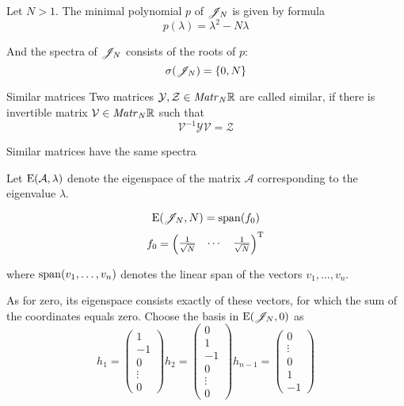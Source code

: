 \documentclass{article}
\begin{document}
\begin{propose}
    Let \( N>1 \).
    The minimal polynomial \( p \) of \( \mathscr{J}_{N} \) is given by formula
    \[p(\lambda) = \lambda^2 - N \lambda\]

    And the spectra of \( \mathscr{J}_{N} \) consists of the roots of \( p \):
    \[\sigma(\mathscr{J}_{N}) = \{ 0, N \}\]
\end{propose}

\begin{dfn}{Similar matrices}
    Two matrices \( \mathcal Y, \mathcal Z \in\mathit{Matr}_{N} {\mathbb{R}} \) are called similar,
    if there is invertible matrix \( \mathcal V\in\mathit{Matr}_{N} {\mathbb{R}} \) such that
    \[\mathcal V^{-1}\mathcal Y\mathcal V = \mathcal Z\]
\end{dfn}
\begin{propose}
    Similar matrices have the same spectra
\end{propose}

Let \( \mathrm{E}({\mathcal A}, {\lambda}) \) denote the eigenspace of the matrix \( \mathcal A \)
corresponding to the eigenvalue \( \lambda \).

\begin{propose}
    \[\mathrm{E}({\mathscr{J}_{N}}, {N}) = \mathrm{span}({f_0})\]
    \[f_0 = \begin{pmatrix} \frac{1}{\sqrt N} & \cdots & \frac{1}{\sqrt N} \end{pmatrix}^{\mathrm{T}}\]

        where \( \mathrm{span}({v_1, \ldots, v_n}) \) denotes the linear span of the vectors \( v_1, \ldots, v_n \).
\end{propose}

As for zero, its eigenspace consists exactly of these vectors,
for which the sum of the coordinates equals zero.
Choose the basis in \( \mathrm{E}({\mathscr{J}_{N}}, {0}) \) as
\[
h_1 = \begin{pmatrix}1 \\ -1 \\ 0 \\ \vdots \\ 0\end{pmatrix}
    h_2 = \begin{pmatrix}0 \\ 1 \\ -1 \\ 0 \\ \vdots \\ 0\end{pmatrix}
        h_{n-1} = \begin{pmatrix}0 \\ \vdots \\ 0 \\ 1 \\ -1 \end{pmatrix}\]
\end{document}
